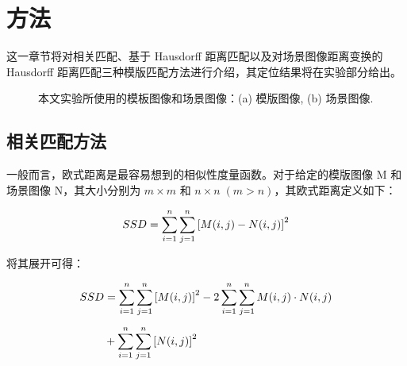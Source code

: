\section{方法} 
\label{sec:proposed}

这一章节将对相关匹配、基于 Hausdorff 距离匹配以及对场景图像距离变换的 Hausdorff 距离匹配三种模版匹配方法进行介绍，其定位结果将在实验部分给出。

\begin{figure}[!ht]
  \centering
  \begin{minipage}[b]{\linewidth} 
  \end{minipage}
  \vfill
  \caption{本文实验所使用的模板图像和场景图像：(a) 模版图像, (b) 场景图像.}
  \label{fig:data}
\end{figure}


\subsection{相关匹配方法}

一般而言，欧式距离是最容易想到的相似性度量函数。对于给定的模版图像 M 和场景图像 N，其大小分别为 $m \times m$ 和 $n \times n\;(m>n)$，其欧式距离定义如下：

\begin{equation}
SSD=\sum_{i=1}^n \sum_{j=1}^n\left[M(i, j)-N(i, j)\right]^2
\vspace{0.5cm}
\end{equation}

将其展开可得：

\begin{equation}
\begin{split}
	SSD&=\sum_{i=1}^n \sum_{j=1}^n\left[M(i, j)\right]^2-2\sum_{i=1}^n \sum_{j=1}^n M(i, j)\cdot N(i, j)\\[0.5em]&+\sum_{i=1}^n \sum_{j=1}^n\left[N(i, j)\right]^2
\end{split}
\vspace{0.5cm}
\end{equation}

